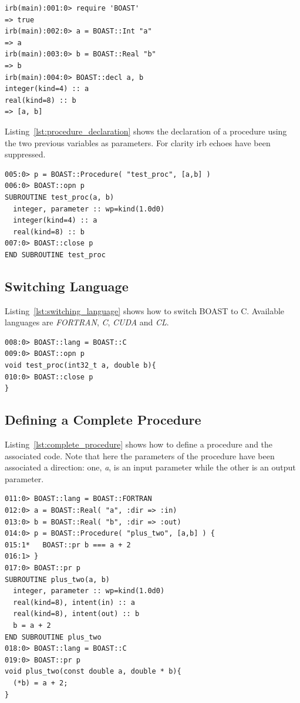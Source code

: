 \documentclass[11pt, a4paper, twoside]{montblanc}
\begin{document}
\begin{lstlisting}
irb(main):001:0> require 'BOAST'
=> true
irb(main):002:0> a = BOAST::Int "a"
=> a
irb(main):003:0> b = BOAST::Real "b"
=> b
irb(main):004:0> BOAST::decl a, b
integer(kind=4) :: a
real(kind=8) :: b
=> [a, b]
\end{lstlisting}

Listing~\ref{lst:procedure_declaration} shows the declaration of a procedure
using the two previous variables as parameters. For clarity irb echoes have
been suppressed.

\begin{lstlisting}
005:0> p = BOAST::Procedure( "test_proc", [a,b] )
006:0> BOAST::opn p
SUBROUTINE test_proc(a, b)
  integer, parameter :: wp=kind(1.0d0)
  integer(kind=4) :: a
  real(kind=8) :: b
007:0> BOAST::close p
END SUBROUTINE test_proc
\end{lstlisting}

\subsection*{Switching Language}

Listing~\ref{lst:switching_language} shows how to switch BOAST to C. Available
languages are \textit{FORTRAN}, \textit{C}, \textit{CUDA} and \textit{CL}.

\begin{lstlisting}
008:0> BOAST::lang = BOAST::C
009:0> BOAST::opn p
void test_proc(int32_t a, double b){
010:0> BOAST::close p
}
\end{lstlisting}

\subsection*{Defining a Complete Procedure}

Listing~\ref{lst:complete_procedure} shows how to define a procedure and the
associated code. Note that here the parameters of the procedure have been
associated a direction: one, \textit{a}, is an input parameter while the other
is an output parameter.

\begin{lstlisting}
011:0> BOAST::lang = BOAST::FORTRAN
012:0> a = BOAST::Real( "a", :dir => :in)
013:0> b = BOAST::Real( "b", :dir => :out)
014:0> p = BOAST::Procedure( "plus_two", [a,b] ) {
015:1*   BOAST::pr b === a + 2
016:1> }
017:0> BOAST::pr p
SUBROUTINE plus_two(a, b)
  integer, parameter :: wp=kind(1.0d0)
  real(kind=8), intent(in) :: a
  real(kind=8), intent(out) :: b
  b = a + 2
END SUBROUTINE plus_two
018:0> BOAST::lang = BOAST::C
019:0> BOAST::pr p
void plus_two(const double a, double * b){
  (*b) = a + 2;
}
\end{lstlisting}
\end{document}
